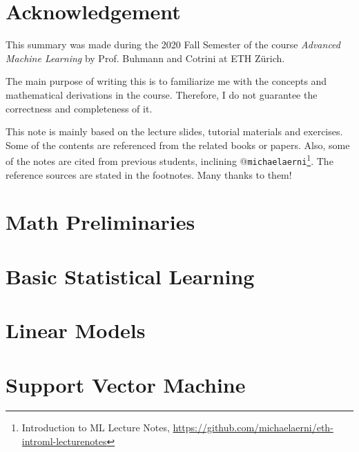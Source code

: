\documentclass{note}
\begin{document}
\frontmatter

\maketitle
\tableofcontents

\pagebreak

\chapter*{Acknowledgement}
This summary was made during the 2020 Fall Semester of the course \emph{Advanced Machine Learning} by Prof. Buhmann and Cotrini at ETH Z\"urich. 

The main purpose of writing this is to familiarize me with the concepts and mathematical derivations in the course. Therefore, I do not guarantee the correctness and completeness of it.

This note is mainly based on the lecture slides, tutorial materials and exercises. Some of the contents are referenced from the related books or papers. Also, some of the notes are cited from previous students, inclining @\texttt{michaelaerni}\footnote{Introduction to ML Lecture Notes, \url{https://github.com/michaelaerni/eth-introml-lecturenotes}}. The reference sources are stated in the footnotes. Many thanks to them!
	
\mainmatter

	\setcounter{page}{0}
    \setcounter{page}{1}
    
	\newpage
	\chapter{Math Preliminaries}
	

	\newpage
	\chapter{Basic Statistical Learning}
	
	
	\newpage
	\chapter{Linear Models}
	
	
	\newpage
	\chapter{Support Vector Machine}
	
	
\end{document}
